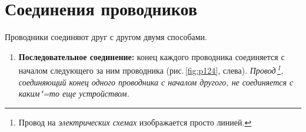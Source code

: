 \documentclass[main.tex]{subfiles}
\begin{document}

 

 

 
   

\section{Соединения проводников}


Проводники соединяют друг с другом двумя способами. 
\begin{enumerate}
    \item \textbf{Последовательное соединение:} конец каждого проводника соединяется с началом следующего за ним проводника (рис.\,\ref{fig:p124}, слева). \emph{Провод\,\footnote{Провод на \emph{электрических схемах} изображается просто линией.}, соединяющий конец одного проводника с началом другого, не соединяется с каким"=то еще устройством.}
    




    



\end{enumerate}
\end{document}
